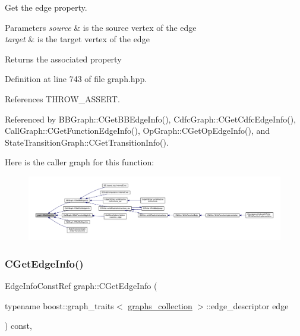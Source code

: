 Get the edge property. 


\begin{DoxyParams}{Parameters}
{\em source} & is the source vertex of the edge \\
\hline
{\em target} & is the target vertex of the edge \\
\hline
\end{DoxyParams}
\begin{DoxyReturn}{Returns}
the associated property 
\end{DoxyReturn}


Definition at line 743 of file graph.\+hpp.



References T\+H\+R\+O\+W\+\_\+\+A\+S\+S\+E\+RT.



Referenced by B\+B\+Graph\+::\+C\+Get\+B\+B\+Edge\+Info(), Cdfc\+Graph\+::\+C\+Get\+Cdfc\+Edge\+Info(), Call\+Graph\+::\+C\+Get\+Function\+Edge\+Info(), Op\+Graph\+::\+C\+Get\+Op\+Edge\+Info(), and State\+Transition\+Graph\+::\+C\+Get\+Transition\+Info().

Here is the caller graph for this function\+:
\nopagebreak
\begin{figure}[H]
\begin{center}
\leavevmode
\includegraphics[width=350pt]{d5/d15/structgraph_a342774370b750895ea04187ef9b00969_icgraph}
\end{center}
\end{figure}
\mbox{\label{structgraph_a10996734a9770a28c6ed28d33a10e149}} 
\subsubsection{\texorpdfstring{C\+Get\+Edge\+Info()}{CGetEdgeInfo()}\hspace{0.1cm}{\footnotesize\ttfamily [2/2]}}
{\footnotesize\ttfamily Edge\+Info\+Const\+Ref graph\+::\+C\+Get\+Edge\+Info (\begin{DoxyParamCaption}\item[{typename boost\+::graph\+\_\+traits$<$ \hyperlink{structgraphs__collection}{graphs\+\_\+collection} $>$\+::edge\+\_\+descriptor}]{edge }\end{DoxyParamCaption}) const\hspace{0.3cm}{\ttfamily [inline]}, {\ttfamily [protected]}}



